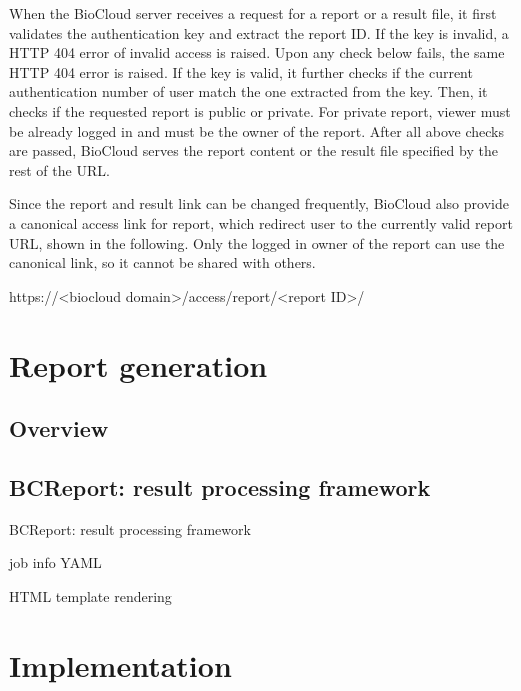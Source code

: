 When the BioCloud server receives a request for a report or a result file, it
first validates the authentication key and extract the report ID. If the key is
invalid, a HTTP 404 error of invalid access is raised. Upon any check below
fails, the same HTTP 404 error is raised. If the key is valid, it further
checks if the current authentication number of user match the one extracted
from the key. Then, it checks if the requested report is public or private. For
private report, viewer must be already logged in and must be the owner of the
report. After all above checks are passed, BioCloud serves the report content
or the result file specified by the rest of the URL.

Since the report and result link can be changed frequently, BioCloud also
provide a canonical access link for report, which redirect user to the
currently valid report URL, shown in the following. Only the logged in owner of
the report can use the canonical link, so it cannot be shared with others.

\begin{CVerbatim}[fontsize=\small]
https://<biocloud domain>/access/report/<report ID>/
\end{CVerbatim}




\section{Report generation}
\label{s:report-generation}

\subsection{Overview}



\subsection{BCReport: result processing framework}


BCReport: result processing framework

    job info YAML

HTML template rendering



\section{Implementation}


